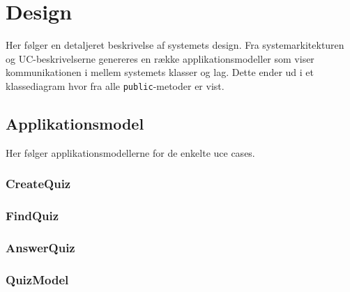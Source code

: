 \chapter{Design}
Her følger en detaljeret beskrivelse af systemets design. Fra systemarkitekturen og UC-beskrivelserne genereres en række applikationsmodeller som viser kommunikationen i mellem systemets klasser og lag. Dette ender ud i et klassediagram hvor fra alle \verb+public+-metoder er vist.

\section{Applikationsmodel}
Her følger applikationsmodellerne for de enkelte uce cases.

\subsection{CreateQuiz}

\subsection{FindQuiz}

\subsection{AnswerQuiz}

\subsection{QuizModel}

